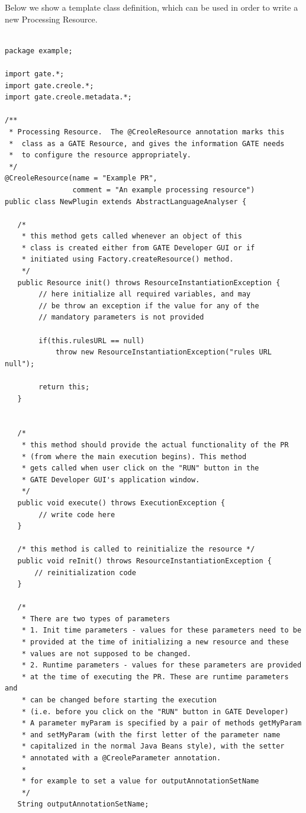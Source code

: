 

Below we show a template class definition, which can be used in order to write a
new Processing Resource.

\begin{lstlisting}

package example;

import gate.*;
import gate.creole.*;
import gate.creole.metadata.*;

/**
 * Processing Resource.  The @CreoleResource annotation marks this
 *  class as a GATE Resource, and gives the information GATE needs
 *  to configure the resource appropriately.
 */
@CreoleResource(name = "Example PR",
                comment = "An example processing resource")
public class NewPlugin extends AbstractLanguageAnalyser {

   /* 
    * this method gets called whenever an object of this
    * class is created either from GATE Developer GUI or if 
    * initiated using Factory.createResource() method.
    */
   public Resource init() throws ResourceInstantiationException {
        // here initialize all required variables, and may
        // be throw an exception if the value for any of the
        // mandatory parameters is not provided

        if(this.rulesURL == null)
            throw new ResourceInstantiationException("rules URL null");

        return this;
   }


   /*
    * this method should provide the actual functionality of the PR
    * (from where the main execution begins). This method 
    * gets called when user click on the "RUN" button in the 
    * GATE Developer GUI's application window.     
    */
   public void execute() throws ExecutionException {
        // write code here
   }

   /* this method is called to reinitialize the resource */
   public void reInit() throws ResourceInstantiationException {
       // reinitialization code
   }

   /*
    * There are two types of parameters
    * 1. Init time parameters - values for these parameters need to be 
    * provided at the time of initializing a new resource and these 
    * values are not supposed to be changed.
    * 2. Runtime parameters - values for these parameters are provided  
    * at the time of executing the PR. These are runtime parameters and
    * can be changed before starting the execution 
    * (i.e. before you click on the "RUN" button in GATE Developer)
    * A parameter myParam is specified by a pair of methods getMyParam
    * and setMyParam (with the first letter of the parameter name
    * capitalized in the normal Java Beans style), with the setter
    * annotated with a @CreoleParameter annotation.
    *
    * for example to set a value for outputAnnotationSetName
    */
   String outputAnnotationSetName;


\end{lstlisting}
